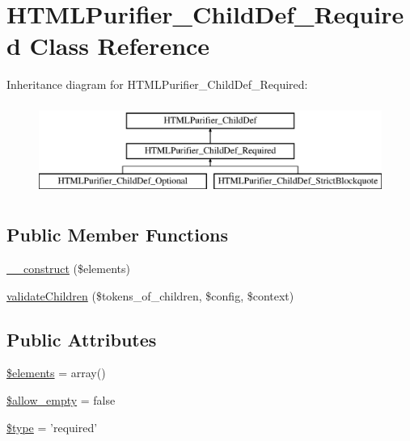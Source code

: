\hypertarget{classHTMLPurifier__ChildDef__Required}{\section{H\+T\+M\+L\+Purifier\+\_\+\+Child\+Def\+\_\+\+Required Class Reference}
\label{classHTMLPurifier__ChildDef__Required}
}
Inheritance diagram for H\+T\+M\+L\+Purifier\+\_\+\+Child\+Def\+\_\+\+Required\+:\begin{figure}[H]
\begin{center}
\leavevmode
\includegraphics[height=3.000000cm]{classHTMLPurifier__ChildDef__Required}
\end{center}
\end{figure}
\subsection*{Public Member Functions}
\begin{DoxyCompactItemize}
\item 
\hyperlink{classHTMLPurifier__ChildDef__Required_ae9234acd6960fc4cd6662df12a577930}{\+\_\+\+\_\+construct} (\$elements)
\item 
\hyperlink{classHTMLPurifier__ChildDef__Required_aca6b295e0cb1606e211dcda73196861f}{validate\+Children} (\$tokens\+\_\+of\+\_\+children, \$config, \$context)
\end{DoxyCompactItemize}
\subsection*{Public Attributes}
\begin{DoxyCompactItemize}
\item 
\hyperlink{classHTMLPurifier__ChildDef__Required_aedbceaeb60dd657ff3538589c21149a6}{\$elements} = array()
\item 
\hyperlink{classHTMLPurifier__ChildDef__Required_aee98174a19b3f1f8a1e37c1344039713}{\$allow\+\_\+empty} = false
\item 
\hyperlink{classHTMLPurifier__ChildDef__Required_a2f815a4acff5b44801bc21f353871c62}{\$type} = 'required'
\end{DoxyCompactItemize}
